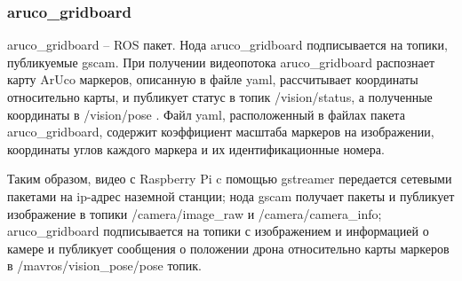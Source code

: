 \subsubsection{aruco\_gridboard}
aruco\_gridboard -- ROS пакет. Нода aruco\_gridboard подписывается на топики, публикуемые gscam. При получении видеопотока aruco\_gridboard распознает карту ArUco маркеров, описанную в файле yaml, рассчитывает координаты относительно карты, и публикует статус в топик /vision/status, а полученные координаты в /vision/pose \cite{grid}. Файл yaml, расположенный в файлах пакета aruco\_gridboard, содержит коэффициент масштаба маркеров на изображении, координаты углов каждого маркера и их идентификационные номера.

Таким образом, видео с Raspberry Pi c помощью gstreamer передается сетевыми пакетами на ip-адрес наземной станции; нода gscam получает пакеты и публикует изображение в топики /camera/image\_raw и /camera/ca\-me\-ra\_info; aruco\_gridboard подписывается на топики с изображением и информацией о камере и публикует сообщения о положении дрона относительно карты маркеров в /mav\-ros/vi\-sion\_pose/pose топик.


